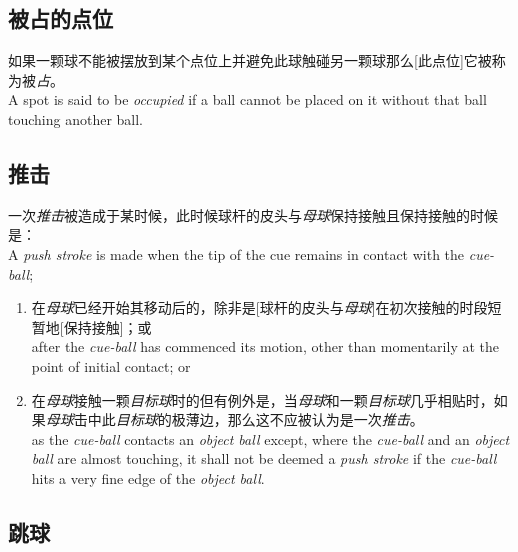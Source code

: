 \subsection{被占的点位}

\noindent 如果一颗球不能被摆放到某个点位上并避免此球触碰另一颗球那么[此点位]它被称为被\textit{占}。\\
A spot is said to be \textit{occupied} if a ball cannot be placed on it without that ball touching another ball.

\subsection{推击}

\noindent 一次\textit{推击}被造成于某时候，此时候球杆的皮头与\textit{母球}保持接触且保持接触的时候是：\\
A \textit{push stroke} is made when the tip of the cue remains in contact with the \textit{cue-ball};
\begin{enumerate}[label=(\alph*)]
    \item 在\textit{母球}已经开始其移动后的，除非是[球杆的皮头与\textit{母球}]在初次接触的时段短暂地[保持接触]；或\\
    after the \textit{cue-ball} has commenced its motion, other than momentarily at the point of initial contact; or
    \item 在\textit{母球}接触一颗\textit{目标球}时的但有例外是，当\textit{母球}和一颗\textit{目标球}几乎相贴时，如果\textit{母球}击中此\textit{目标球}的极薄边，那么这不应被认为是一次\textit{推击}。\\
    as the \textit{cue-ball} contacts an \textit{object ball} except, where the \textit{cue-ball} and an \textit{object ball} are almost touching, it shall not be deemed a \textit{push stroke} if the \textit{cue-ball} hits a very fine edge of the \textit{object ball}.
\end{enumerate}

\subsection{跳球}

